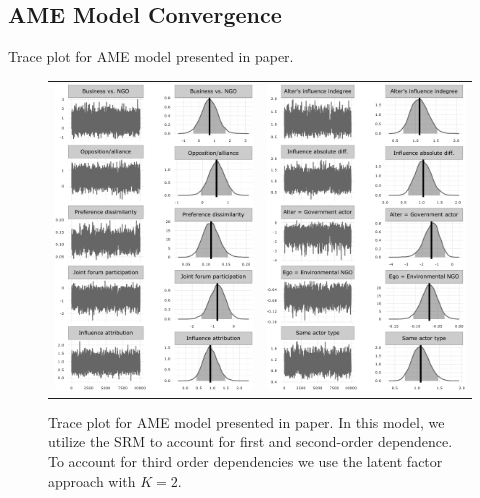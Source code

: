 \documentclass[12pt,pdflatex]{elsarticle}
\begin{document}
\subsection{AME Model Convergence}
\label{sec:ameConvAppendix}

Trace plot for AME model presented in paper.

\begin{figure}[ht]
	\centering
	\begin{tabular}{cc}
	\includegraphics[width=.45\textwidth]{ameConv1_SR2} &
	\includegraphics[width=.45\textwidth]{ameConv2_SR2}
	\end{tabular}
	\caption{Trace plot for AME model presented in paper. In this model, we utilize the SRM to account for first and second-order dependence. To account for third order dependencies we use the latent factor approach with $K=2$.}
	\label{fig:ameConv}
\end{figure}
\FloatBarrier
\newpage
\end{document}

